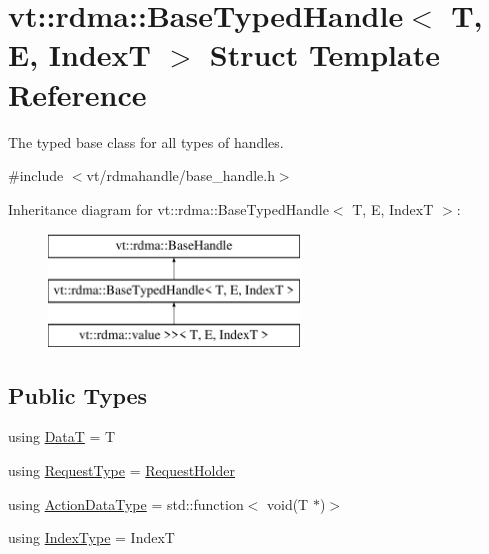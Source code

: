 \hypertarget{structvt_1_1rdma_1_1_base_typed_handle}{}\section{vt\+:\+:rdma\+:\+:Base\+Typed\+Handle$<$ T, E, IndexT $>$ Struct Template Reference}
\label{structvt_1_1rdma_1_1_base_typed_handle}


The typed base class for all types of handles.  




{\ttfamily \#include $<$vt/rdmahandle/base\+\_\+handle.\+h$>$}

Inheritance diagram for vt\+:\+:rdma\+:\+:Base\+Typed\+Handle$<$ T, E, IndexT $>$\+:\begin{figure}[H]
\begin{center}
\leavevmode
\includegraphics[height=3.000000cm]{structvt_1_1rdma_1_1_base_typed_handle}
\end{center}
\end{figure}
\subsection*{Public Types}
\begin{DoxyCompactItemize}
\item 
using \hyperlink{structvt_1_1rdma_1_1_base_typed_handle_a442fed4e2898c2fc2b7e8686283efdde}{DataT} = T
\item 
using \hyperlink{structvt_1_1rdma_1_1_base_typed_handle_a449c2c1948f5793c3fdfb1aba5801ed7}{Request\+Type} = \hyperlink{structvt_1_1rdma_1_1_request_holder}{Request\+Holder}
\item 
using \hyperlink{structvt_1_1rdma_1_1_base_typed_handle_a20c231fb671a38c3bb761d613dd42b3c}{Action\+Data\+Type} = std\+::function$<$ void(T $\ast$)$>$
\item 
using \hyperlink{structvt_1_1rdma_1_1_base_typed_handle_aca839871dda1f44f8e59a451174b9a2a}{Index\+Type} = IndexT
\end{DoxyCompactItemize}
